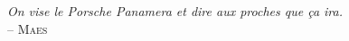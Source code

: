  \begin{dedication}

\hspace{7.5cm} \textit{On vise le Porsche Panamera et dire aux proches que ça ira.} \\
\hspace{14cm}-- \textsc{Maes}
\end{dedication}

